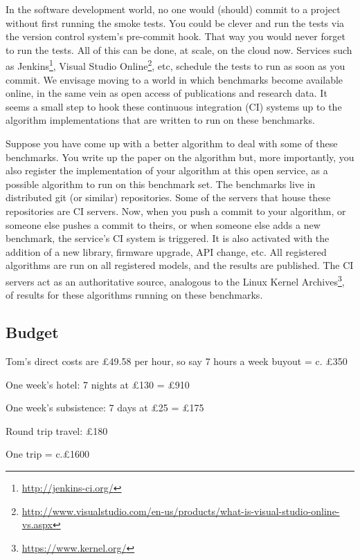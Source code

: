 \documentclass[a4paper,11pt]{article}
\begin{document}
In the software development world, no one would (should) commit to a
project without first running the smoke tests. You could be clever and
run the tests via the version control system's pre-commit hook. That
way you would never forget to run the tests. All of this can be done,
at scale, on the cloud now. Services such as
Jenkins\footnote{\url{http://jenkins-ci.org/}}, Visual Studio
Online\footnote{\url{http://www.visualstudio.com/en-us/products/what-is-visual-studio-online-vs.aspx}},
etc, schedule the tests to run as soon as you commit. We envisage
moving to a world in which benchmarks become available online, in the
same vein as open access of publications and research data. It seems a
small step to hook these continuous integration (CI) systems up to the
algorithm implementations that are written to run on these benchmarks.

Suppose you have come up with a better algorithm to deal with some of
these benchmarks. You write up the paper on the algorithm but, more
importantly, you also register the implementation of your algorithm at
this open service, as a possible algorithm to run on this benchmark
set. The benchmarks live in distributed git (or similar)
repositories. Some of the servers that house these repositories are CI
servers. Now, when you push a commit to your algorithm, or someone
else pushes a commit to theirs, or when someone else adds a new
benchmark, the service's CI system is triggered. It is also activated
with the addition of a new library, firmware upgrade, API change,
etc. All registered algorithms are run on all registered models, and
the results are published. The CI servers act as an authoritative
source, analogous to the Linux Kernel
Archives\footnote{\url{https://www.kernel.org/}}, of results for these
algorithms running on these benchmarks.



\subsection*{Budget}

Tom's direct costs are \pounds 49.58 per hour, so say 7 hours a week
buyout = c. \pounds 350

One week's hotel: 7 nights at \pounds 130 = \pounds 910

One week's subsistence: 7 days at \pounds 25 = \pounds 175

Round trip travel: \pounds 180

One trip = c.£1600
\end{document}
